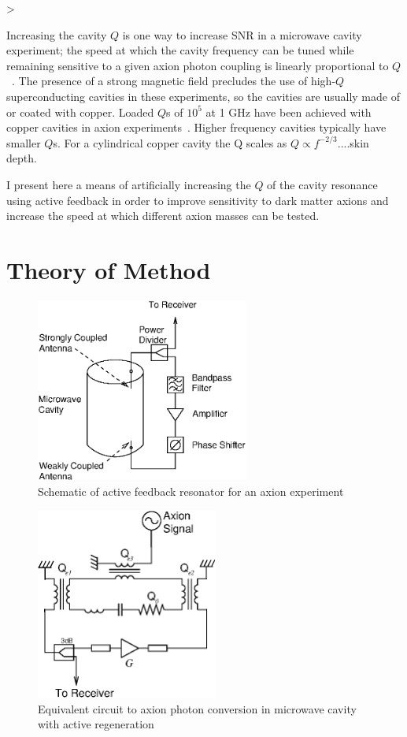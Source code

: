 >\documentclass[aps,prl,twocolumn,groupedaddress]{revtex4-1}
\begin{document}
Increasing the cavity $Q$ is one way to increase SNR in a microwave cavity experiment; the speed at which the cavity frequency can be tuned while remaining sensitive to a given axion photon coupling is linearly proportional to $Q$~\cite{Peng2000569}.
The presence of a strong magnetic field precludes the use of high-$Q$ superconducting cavities in these experiments, so the cavities are usually made of or coated with copper.
Loaded $Q$s of $10^5$ at 1 GHz have been achieved with copper cavities in axion experiments~\cite{Peng2000569}.  Higher frequency cavities typically have smaller $Q$s.
For a cylindrical copper cavity the Q scales as $Q \propto f^{-2/3}$....skin depth.

I present here a means of artificially increasing the $Q$ of the cavity resonance using active feedback in order to improve sensitivity to dark matter axions and increase the speed at which different axion masses can be tested.

\section{Theory of Method}

\begin{figure}
\includegraphics[width=7cm]{figs/experiment_schematic.eps}
\caption{\label{fig:experiment_schematic} Schematic of active feedback resonator for an axion experiment}
\end{figure}

\begin{figure}
\includegraphics[width=6cm]{figs/equivalent_circuit.eps}
\caption{\label{fig:equiv_circuit} Equivalent circuit to axion photon conversion in microwave cavity with active regeneration}
\end{figure}
\end{document}
